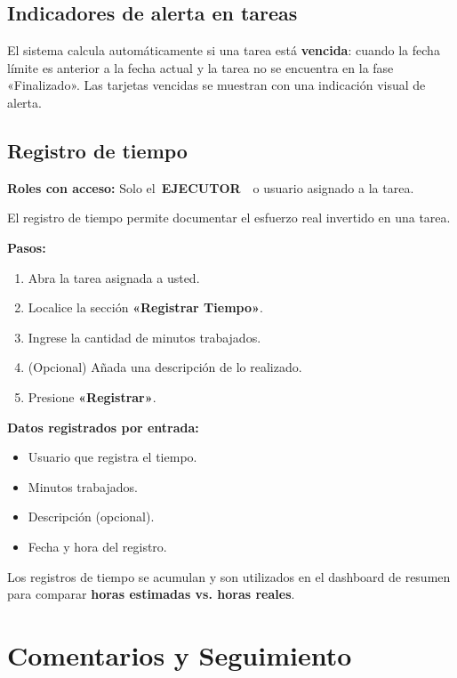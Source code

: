 \documentclass[12pt, a4paper]{article}
\newcommand{\rolbadge}[2]{%
  \colorbox{#1}{\color{white}\footnotesize\bfseries\,#2\,}%
}
\newcommand{\executor}{\rolbadge{executorcolor}{EJECUTOR}}
\begin{document}
\subsection{Indicadores de alerta en tareas}

El sistema calcula automáticamente si una tarea está \textbf{vencida}: cuando la fecha límite es anterior a la fecha actual y la tarea no se encuentra en la fase «Finalizado». Las tarjetas vencidas se muestran con una indicación visual de alerta.

\subsection{Registro de tiempo}
\label{sec:tiempo}

\begin{notebox}
\textbf{Roles con acceso:} Solo el \executor\ o usuario asignado a la tarea.
\end{notebox}

El registro de tiempo permite documentar el esfuerzo real invertido en una tarea.

\textbf{Pasos:}
\begin{enumerate}
  \item Abra la tarea asignada a usted.
  \item Localice la sección \textbf{«Registrar Tiempo»}.
  \item Ingrese la cantidad de minutos trabajados.
  \item (Opcional) Añada una descripción de lo realizado.
  \item Presione \textbf{«Registrar»}.
\end{enumerate}

\textbf{Datos registrados por entrada:}
\begin{itemize}
  \item Usuario que registra el tiempo.
  \item Minutos trabajados.
  \item Descripción (opcional).
  \item Fecha y hora del registro.
\end{itemize}

Los registros de tiempo se acumulan y son utilizados en el dashboard de resumen para comparar \textbf{horas estimadas vs. horas reales}.

\section{Comentarios y Seguimiento}
\end{document}
